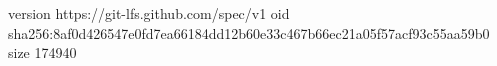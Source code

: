 version https://git-lfs.github.com/spec/v1
oid sha256:8af0d426547e0fd7ea66184dd12b60e33c467b66ec21a05f57acf93c55aa59b0
size 174940
